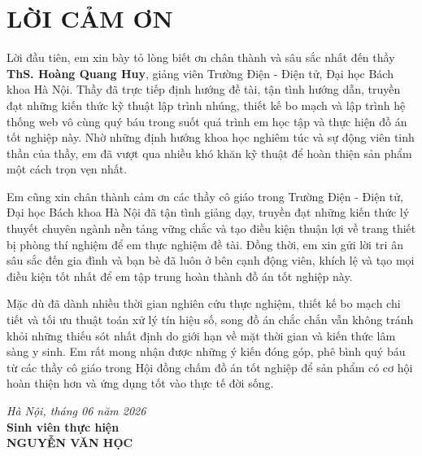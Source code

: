 {
\renewcommand{\baselinestretch}{1.3}
\setlength{\parskip}{4pt}
\section*{LỜI CẢM ƠN}
\thispagestyle{empty}

Lời đầu tiên, em xin bày tỏ lòng biết ơn chân thành và sâu sắc nhất đến thầy \textbf{ThS. Hoàng Quang Huy}, giảng viên Trường Điện - Điện tử, Đại học Bách khoa Hà Nội. Thầy đã trực tiếp định hướng đề tài, tận tình hướng dẫn, truyền đạt những kiến thức kỹ thuật lập trình nhúng, thiết kế bo mạch và lập trình hệ thống web vô cùng quý báu trong suốt quá trình em học tập và thực hiện đồ án tốt nghiệp này. Nhờ những định hướng khoa học nghiêm túc và sự động viên tinh thần của thầy, em đã vượt qua nhiều khó khăn kỹ thuật để hoàn thiện sản phẩm một cách trọn vẹn nhất.

Em cũng xin chân thành cảm ơn các thầy cô giáo trong Trường Điện - Điện tử, Đại học Bách khoa Hà Nội đã tận tình giảng dạy, truyền đạt những kiến thức lý thuyết chuyên ngành nền tảng vững chắc và tạo điều kiện thuận lợi về trang thiết bị phòng thí nghiệm để em thực nghiệm đề tài. Đồng thời, em xin gửi lời tri ân sâu sắc đến gia đình và bạn bè đã luôn ở bên cạnh động viên, khích lệ và tạo mọi điều kiện tốt nhất để em tập trung hoàn thành đồ án tốt nghiệp này.

Mặc dù đã dành nhiều thời gian nghiên cứu thực nghiệm, thiết kế bo mạch chi tiết và tối ưu thuật toán xử lý tín hiệu số, song đồ án chắc chắn vẫn không tránh khỏi những thiếu sót nhất định do giới hạn về mặt thời gian và kiến thức lâm sàng y sinh. Em rất mong nhận được những ý kiến đóng góp, phê bình quý báu từ các thầy cô giáo trong Hội đồng chấm đồ án tốt nghiệp để sản phẩm có cơ hội hoàn thiện hơn và ứng dụng tốt vào thực tế đời sống.

\vspace{0.3cm}
\hfill
\begin{minipage}{0.5\textwidth}
    \centering
    \textit{Hà Nội, tháng 06 năm 2026} \\
    \vspace{0.2cm}
    \textbf{Sinh viên thực hiện} \\
    \vspace{1.3cm}
    \textbf{NGUYỄN VĂN HỌC}
\end{minipage}
\cleardoublepage
}
